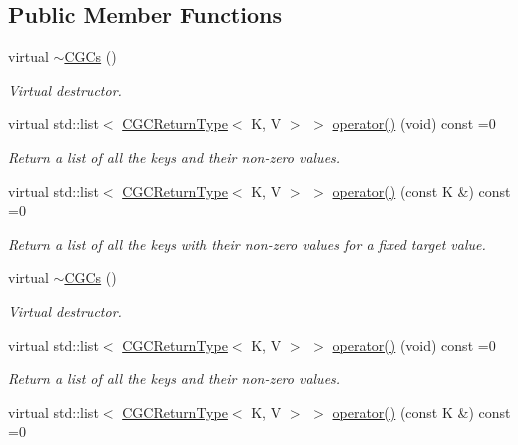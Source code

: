 \subsection*{Public Member Functions}
\begin{DoxyCompactItemize}
\item 
virtual \mbox{\hyperlink{classHadron_1_1CGCs_a882c1ea3451254725b9d86c598d6c29a}{$\sim$\+C\+G\+Cs}} ()
\begin{DoxyCompactList}\small\item\em Virtual destructor. \end{DoxyCompactList}\item 
virtual std\+::list$<$ \mbox{\hyperlink{structHadron_1_1CGCReturnType}{C\+G\+C\+Return\+Type}}$<$ K, V $>$ $>$ \mbox{\hyperlink{classHadron_1_1CGCs_ac709374b31c0319e82028b9d7c23e993}{operator()}} (void) const =0
\begin{DoxyCompactList}\small\item\em Return a list of all the keys and their non-\/zero values. \end{DoxyCompactList}\item 
virtual std\+::list$<$ \mbox{\hyperlink{structHadron_1_1CGCReturnType}{C\+G\+C\+Return\+Type}}$<$ K, V $>$ $>$ \mbox{\hyperlink{classHadron_1_1CGCs_a8d2d80be37b603359708ebdd5923ff47}{operator()}} (const K \&) const =0
\begin{DoxyCompactList}\small\item\em Return a list of all the keys with their non-\/zero values for a fixed target value. \end{DoxyCompactList}\item 
virtual \mbox{\hyperlink{classHadron_1_1CGCs_a882c1ea3451254725b9d86c598d6c29a}{$\sim$\+C\+G\+Cs}} ()
\begin{DoxyCompactList}\small\item\em Virtual destructor. \end{DoxyCompactList}\item 
virtual std\+::list$<$ \mbox{\hyperlink{structHadron_1_1CGCReturnType}{C\+G\+C\+Return\+Type}}$<$ K, V $>$ $>$ \mbox{\hyperlink{classHadron_1_1CGCs_ac709374b31c0319e82028b9d7c23e993}{operator()}} (void) const =0
\begin{DoxyCompactList}\small\item\em Return a list of all the keys and their non-\/zero values. \end{DoxyCompactList}\item 
virtual std\+::list$<$ \mbox{\hyperlink{structHadron_1_1CGCReturnType}{C\+G\+C\+Return\+Type}}$<$ K, V $>$ $>$ \mbox{\hyperlink{classHadron_1_1CGCs_a8d2d80be37b603359708ebdd5923ff47}{operator()}} (const K \&) const =0

\end{DoxyCompactItemize}
